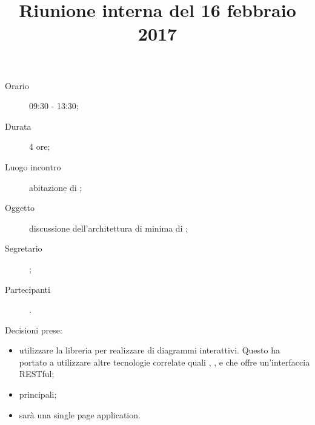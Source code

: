 


\author{\LS}
\supervisor{\LB}
\title{Riunione interna del 16 febbraio 2017}



\maketitle

\begin{description}
	\item[Orario] 09:30 - 13:30;
	\item[Durata] 4 ore;
	\item[Luogo incontro] abitazione di \LS;
	\item[Oggetto] discussione dell'architettura di minima di \proj{};
	\item[Segretario] \LS; 
	\item[Partecipanti] \ALL.
\end{description}
Decisioni prese:
\begin{itemize}
\item utilizzare la libreria \jointjs{} per realizzare  di diagrammi interattivi. Questo ha portato a utilizzare altre tecnologie correlate quali \html{}, \jquery{}, \lodash{} e \backbonejs{} che offre un'interfaccia RESTful;
\item {} principali;
\item \proj{} sarà una single page application.
\end{itemize}

